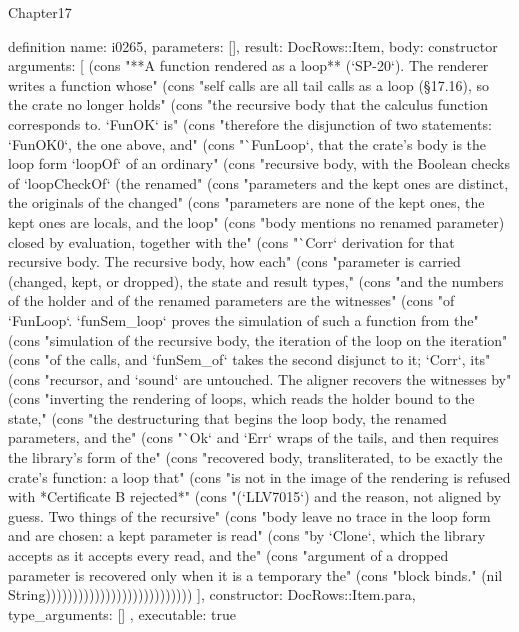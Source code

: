 \begin{lexlean}{Chapter17}
\begin{semanticmodule}
definition{
  name: i0265,
  parameters: [],
  result: DocRows::Item,
  body: constructor{
    arguments: [
      (cons "**A function rendered as a loop** (`SP-20`). The renderer writes a function whose" (cons "self calls are all tail calls as a loop (§17.16), so the crate no longer holds" (cons "the recursive body that the calculus function corresponds to. `FunOK` is" (cons "therefore the disjunction of two statements: `FunOK0`, the one above, and" (cons "`FunLoop`, that the crate's body is the loop form `loopOf` of an ordinary" (cons "recursive body, with the Boolean checks of `loopCheckOf` (the renamed" (cons "parameters and the kept ones are distinct, the originals of the changed" (cons "parameters are none of the kept ones, the kept ones are locals, and the loop" (cons "body mentions no renamed parameter) closed by evaluation, together with the" (cons "`Corr` derivation for that recursive body. The recursive body, how each" (cons "parameter is carried (changed, kept, or dropped), the state and result types," (cons "and the numbers of the holder and of the renamed parameters are the witnesses" (cons "of `FunLoop`. `funSem_loop` proves the simulation of such a function from the" (cons "simulation of the recursive body, the iteration of the loop on the iteration" (cons "of the calls, and `funSem_of` takes the second disjunct to it; `Corr`, its" (cons "recursor, and `sound` are untouched. The aligner recovers the witnesses by" (cons "inverting the rendering of loops, which reads the holder bound to the state," (cons "the destructuring that begins the loop body, the renamed parameters, and the" (cons "`Ok` and `Err` wraps of the tails, and then requires the library's form of the" (cons "recovered body, transliterated, to be exactly the crate's function: a loop that" (cons "is not in the image of the rendering is refused with *Certificate B rejected*" (cons "(`LLV7015`) and the reason, not aligned by guess. Two things of the recursive" (cons "body leave no trace in the loop form and are chosen: a kept parameter is read" (cons "by `Clone`, which the library accepts as it accepts every read, and the" (cons "argument of a dropped parameter is recovered only when it is a temporary the" (cons "block binds." (nil String)))))))))))))))))))))))))))
    ],
    constructor: DocRows::Item.para,
    type_arguments: []
  },
  executable: true
}


\end{semanticmodule}
\end{lexlean}
